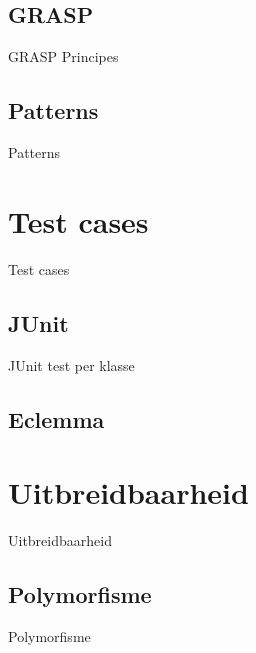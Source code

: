\documentclass[t]{beamer}
\begin{document}
\subsection{GRASP}
\begin{frame}{GRASP Principes}

\end{frame}

\subsection{Patterns}
\begin{frame}{Patterns}

\end{frame}

\section{Test cases}
\begin{frame}{Test cases}
\begin{multicols}{2}
\tableofcontents[currentsection]
\end{multicols}
\end{frame}

\subsection{JUnit}
\begin{frame}{JUnit test per klasse}

\end{frame}

\subsection{Eclemma}
\begin{frame}

\end{frame}


\section{Uitbreidbaarheid}
\begin{frame}{Uitbreidbaarheid}
\begin{multicols}{2}
\tableofcontents[currentsection]
\end{multicols}
\end{frame}

\subsection{Polymorfisme}
\begin{frame}{Polymorfisme}

\end{frame}
\end{document}
